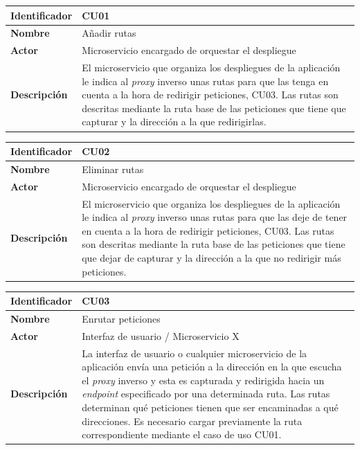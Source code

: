 \documentclass[11pt,spanish,listoffigures]{tfgetsinf}
\begin{document}
\begin{center} \begin{tabular}{| l | p{11.3cm} |}
\hline
\textbf{Identificador} & CU01
\\ \hline
\textbf{Nombre} & Añadir rutas
\\ \hline
\textbf{Actor} & Microservicio encargado de orquestar el despliegue
\\ \hline
\textbf{Descripción} & El microservicio que organiza los despliegues de la aplicación le indica al \emph{proxy} inverso unas rutas para que las tenga en cuenta a la hora de redirigir peticiones, CU03. Las rutas son descritas mediante la ruta base de las peticiones que tiene que capturar y la dirección a la que redirigirlas.
\\ \hline \end{tabular} \end{center}

\begin{center} \begin{tabular}{| l | p{11.3cm} |}
\hline
\textbf{Identificador} & CU02
\\ \hline
\textbf{Nombre} & Eliminar rutas
\\ \hline
\textbf{Actor} & Microservicio encargado de orquestar el despliegue
\\ \hline
\textbf{Descripción} & El microservicio que organiza los despliegues de la aplicación le indica al \emph{proxy} inverso unas rutas para que las deje de tener en cuenta a la hora de redirigir peticiones, CU03. Las rutas son descritas mediante la ruta base de las peticiones que tiene que dejar de capturar y la dirección a la que no redirigir más peticiones.
\\ \hline \end{tabular} \end{center}

\begin{center} \begin{tabular}{| l | p{11.3cm} |}
\hline
\textbf{Identificador} & CU03
\\ \hline
\textbf{Nombre} & Enrutar peticiones
\\ \hline
\textbf{Actor} & Interfaz de usuario / Microservicio X
\\ \hline
\textbf{Descripción} & La interfaz de usuario o cualquier microservicio de la aplicación envía una petición a la dirección en la que escucha el \emph{proxy} inverso y esta es capturada y redirigida hacia un \emph{endpoint} especificado por una determinada ruta. Las rutas determinan qué peticiones tienen que ser encaminadas a qué direcciones. Es necesario cargar previamente la ruta correspondiente mediante el caso de uso CU01.
\\ \hline \end{tabular} \end{center}
\end{document}
